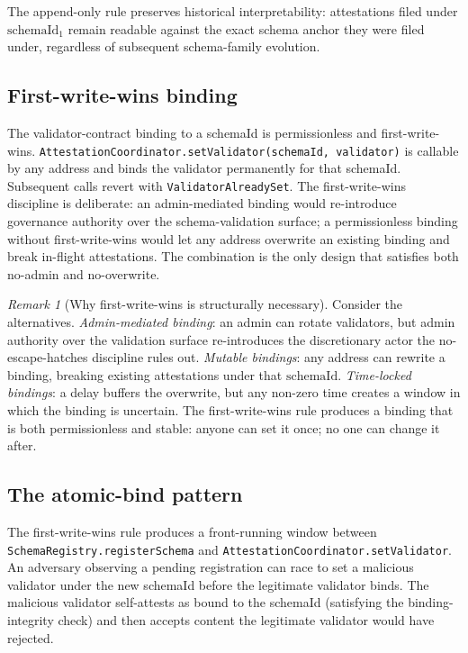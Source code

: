 \documentclass[11pt,a4paper]{article}
\theoremstyle{definition}
\theoremstyle{remark}
\newtheorem{remark}[theorem]{Remark}
\newcommand{\schemaid}{\mathrm{schemaId}}
\begin{document}
The append-only rule preserves historical interpretability:
attestations filed under $\schemaid_1$ remain readable against the
exact schema anchor they were filed under, regardless of subsequent
schema-family evolution.

\subsection{First-write-wins binding}

The validator-contract binding to a schemaId is permissionless and
first-write-wins. \texttt{AttestationCoordinator.setValidator(schemaId,
validator)} is callable by any address and binds the validator
permanently for that schemaId. Subsequent calls revert with
\texttt{ValidatorAlreadySet}. The first-write-wins discipline is
deliberate: an admin-mediated binding would re-introduce governance
authority over the schema-validation surface; a permissionless
binding without first-write-wins would let any address overwrite an
existing binding and break in-flight attestations. The combination
is the only design that satisfies both no-admin and
no-overwrite.

\begin{remark}[Why first-write-wins is structurally necessary]
Consider the alternatives. \emph{Admin-mediated binding}: an admin
can rotate validators, but admin authority over the validation
surface re-introduces the discretionary actor the no-escape-hatches
discipline rules out. \emph{Mutable bindings}: any address can
rewrite a binding, breaking existing attestations under that
$\schemaid$. \emph{Time-locked bindings}: a delay buffers the
overwrite, but any non-zero time creates a window in which the
binding is uncertain. The first-write-wins rule produces a binding
that is both permissionless and stable: anyone can set it once;
no one can change it after.
\end{remark}

\subsection{The atomic-bind pattern}

The first-write-wins rule produces a front-running window between
\texttt{SchemaRegistry.registerSchema} and
\texttt{AttestationCoordinator.setValidator}. An adversary observing
a pending registration can race to set a malicious validator under
the new schemaId before the legitimate validator binds. The
malicious validator self-attests as bound to the schemaId
(satisfying the binding-integrity check) and then accepts content
the legitimate validator would have rejected.
\end{document}
